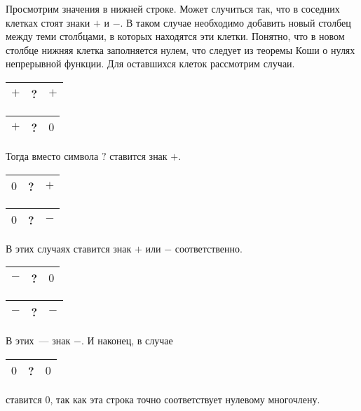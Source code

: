 Просмотрим значения в нижней строке. Может случиться так, что в соседних клетках стоят знаки $+$ и $-$. В таком случае необходимо добавить новый столбец между теми столбцами, в которых находятся эти клетки. Понятно, что в новом столбце нижняя клетка заполняется нулем, что следует из теоремы Коши о нулях непрерывной функции. Для оставшихся клеток рассмотрим случаи.
\begin{center}
    \begin{tabular}{|c|c|c|}
        \hline
        $+$ & ? & $+$\\
        \hline
    \end{tabular}
        \quad
    \begin{tabular}{|c|c|c|}
        \hline
        $+$ & ? & $0$\\
        \hline
    \end{tabular}           
\end{center}
Тогда вместо символа $?$ ставится знак $+$.
\begin{center}
    \begin{tabular}{|c|c|c|}
        \hline
        $0$ & ? & $+$\\
        \hline
    \end{tabular}
        \quad
    \begin{tabular}{|c|c|c|}
        \hline
        $0$ & ? & $-$\\
        \hline
    \end{tabular}           
\end{center}
В этих случаях ставится знак $+$ или $-$ соответственно.
\begin{center}
    \begin{tabular}{|c|c|c|}
        \hline
        $-$ & ? & $0$\\
        \hline
    \end{tabular}
        \quad
    \begin{tabular}{|c|c|c|}
        \hline
        $-$ & ? & $-$\\
        \hline
    \end{tabular}           
\end{center}
В этих~--- знак $-$.
И наконец, в случае 
\begin{center}
    \begin{tabular}{|c|c|c|}
        \hline
        $0$ & ? & $0$\\
        \hline
    \end{tabular} 
\end{center}
ставится $0$, так как эта строка точно соответствует нулевому многочлену.

